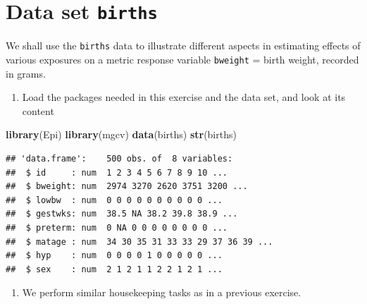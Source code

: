 \documentclass[
]{book}
\newenvironment{Shaded}{\begin{snugshade}}{\end{snugshade}}
\newcommand{\FunctionTok}[1]{\textcolor[rgb]{0.13,0.29,0.53}{\textbf{#1}}}
\newcommand{\NormalTok}[1]{#1}
\providecommand{\tightlist}{%
  \setlength{\itemsep}{0pt}\setlength{\parskip}{0pt}}
\begin{document}
\section{\texorpdfstring{Data set \texttt{births}}{Data set births}}\label{data-set-births}

We shall use the \texttt{births} data to illustrate
different aspects in estimating effects of various exposures on a metric response variable
\texttt{bweight} = birth weight, recorded in grams.

\begin{enumerate}
\def\labelenumi{\arabic{enumi}.}
\tightlist
\item
  Load the packages needed in this exercise and the data set, and look at its content
\end{enumerate}

\begin{Shaded}
\begin{Highlighting}[]
\FunctionTok{library}\NormalTok{(Epi)}
\FunctionTok{library}\NormalTok{(mgcv)}
\FunctionTok{data}\NormalTok{(births)}
\FunctionTok{str}\NormalTok{(births)}
\end{Highlighting}
\end{Shaded}

\begin{verbatim}
## 'data.frame':    500 obs. of  8 variables:
##  $ id     : num  1 2 3 4 5 6 7 8 9 10 ...
##  $ bweight: num  2974 3270 2620 3751 3200 ...
##  $ lowbw  : num  0 0 0 0 0 0 0 0 0 0 ...
##  $ gestwks: num  38.5 NA 38.2 39.8 38.9 ...
##  $ preterm: num  0 NA 0 0 0 0 0 0 0 0 ...
##  $ matage : num  34 30 35 31 33 33 29 37 36 39 ...
##  $ hyp    : num  0 0 0 0 1 0 0 0 0 0 ...
##  $ sex    : num  2 1 2 1 1 2 2 1 2 1 ...
\end{verbatim}

\begin{enumerate}
\def\labelenumi{\arabic{enumi}.}
\setcounter{enumi}{1}
\tightlist
\item
  We perform similar housekeeping tasks as in a previous exercise.
\end{enumerate}
\end{document}
